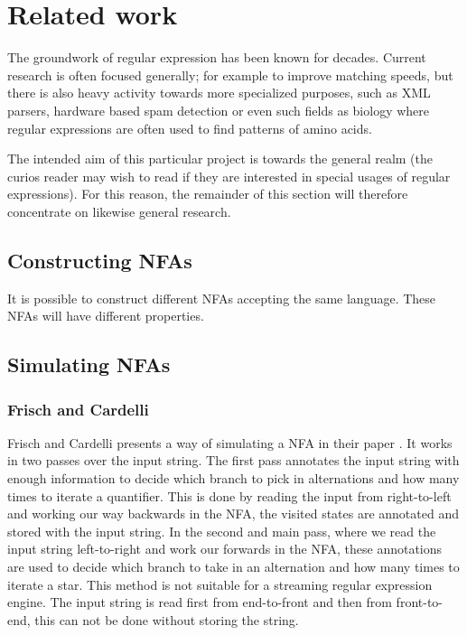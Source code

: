 \section{Related work}
\label{sec:related}

The groundwork of regular expression has been known for
decades. Current research is often focused generally; for
example to improve matching speeds, but there is also heavy activity
towards more specialized purposes, such as XML parsers, hardware based spam
detection or even such fields as biology where regular expressions are
often used to find patterns of amino acids. 

The intended aim of this particular project is towards the general
realm (the curios reader may wish to read \cite{pedersen2010} if they
are interested in special usages of regular expressions). For this
reason, the remainder of this section will therefore concentrate on
likewise general research.



\subsection{Constructing NFAs}

It is possible to construct different NFAs accepting the same
language. These NFAs will have different properties. 


\subsection{Simulating NFAs}

\subsubsection{Frisch and Cardelli}

Frisch and Cardelli presents a way of simulating a NFA in their paper
\cite{2004:GreedyRegularExpressionMatching}. It works in two passes
over the input string. The first pass annotates the input string with
enough information to decide which branch to pick in alternations and
how many times to iterate a quantifier. This is done by reading the
input from right-to-left and working our way backwards in the NFA, the
visited states are annotated and stored with the input string. In the
second and main pass, where we read the input string left-to-right and
work our forwards in the NFA, these annotations are used to decide
which branch to take in an alternation and how many times to iterate a
star. This method is not suitable for a streaming regular expression
engine. The input string is read first from end-to-front and then from
front-to-end, this can not be done without storing the string.

